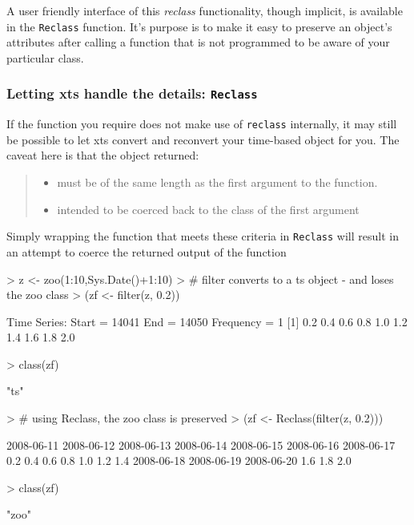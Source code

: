 \documentclass{article}
\begin{document}
A user friendly interface of this \emph{reclass} functionality, though
implicit, is available in the {\tt Reclass} function.
It's purpose is to make it easy to preserve an object's attributes after calling
a function that is not programmed to be aware of your particular class.

\pagebreak
\subsubsection*{Letting xts handle the details: {\tt Reclass}}

If the function you require does not make use of
{\tt reclass} internally, it may still be possible to let
xts convert and reconvert your time-based object for you.
The caveat here is that the object returned:
\begin{quote}
\begin{itemize}
\item must be of the same length as the first argument to
the function.
\item intended to be coerced back to the class of the first
argument
\end{itemize}
\end{quote}
Simply wrapping the function
that meets these criteria in {\tt Reclass} will
result in an
attempt to coerce the returned output of the function

\begin{Schunk}
\begin{Sinput}
> z <- zoo(1:10,Sys.Date()+1:10)
> # filter converts to a ts object - and loses the zoo class
> (zf <- filter(z, 0.2))
\end{Sinput}
\begin{Soutput}
Time Series:
Start = 14041 
End = 14050 
Frequency = 1 
 [1] 0.2 0.4 0.6 0.8 1.0 1.2 1.4 1.6 1.8 2.0
\end{Soutput}
\begin{Sinput}
> class(zf)
\end{Sinput}
\begin{Soutput}
[1] "ts"
\end{Soutput}
\begin{Sinput}
> # using Reclass, the zoo class is preserved
> (zf <- Reclass(filter(z, 0.2)))
\end{Sinput}
\begin{Soutput}
2008-06-11 2008-06-12 2008-06-13 2008-06-14 2008-06-15 2008-06-16 2008-06-17 
       0.2        0.4        0.6        0.8        1.0        1.2        1.4 
2008-06-18 2008-06-19 2008-06-20 
       1.6        1.8        2.0 
\end{Soutput}
\begin{Sinput}
> class(zf)
\end{Sinput}
\begin{Soutput}
[1] "zoo"
\end{Soutput}
\end{Schunk}
\end{document}
